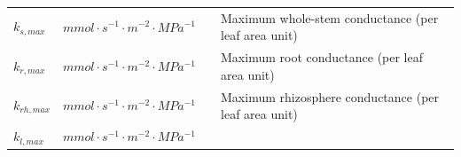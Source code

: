 \documentclass[]{book}
\begin{document}
\begin{longtable}[]{@{}llll@{}}
\begin{minipage}[t]{0.11\columnwidth}\raggedright\strut
\(k_{s, max}\)\strut
\end{minipage} & \begin{minipage}[t]{0.10\columnwidth}\raggedright\strut
\(mmol \cdot s^{-1} \cdot m^{-2} \cdot MPa^{-1}\)\strut
\end{minipage} & \begin{minipage}[t]{0.12\columnwidth}\raggedright\strut
\strut
\end{minipage} & \begin{minipage}[t]{0.45\columnwidth}\raggedright\strut
Maximum whole-stem conductance (per leaf area unit)\strut
\end{minipage}\tabularnewline
\begin{minipage}[t]{0.11\columnwidth}\raggedright\strut
\(k_{r, max}\)\strut
\end{minipage} & \begin{minipage}[t]{0.10\columnwidth}\raggedright\strut
\(mmol \cdot s^{-1} \cdot m^{-2} \cdot MPa^{-1}\)\strut
\end{minipage} & \begin{minipage}[t]{0.12\columnwidth}\raggedright\strut
\strut
\end{minipage} & \begin{minipage}[t]{0.45\columnwidth}\raggedright\strut
Maximum root conductance (per leaf area unit)\strut
\end{minipage}\tabularnewline
\begin{minipage}[t]{0.11\columnwidth}\raggedright\strut
\(k_{rh, max}\)\strut
\end{minipage} & \begin{minipage}[t]{0.10\columnwidth}\raggedright\strut
\(mmol \cdot s^{-1} \cdot m^{-2} \cdot MPa^{-1}\)\strut
\end{minipage} & \begin{minipage}[t]{0.12\columnwidth}\raggedright\strut
\strut
\end{minipage} & \begin{minipage}[t]{0.45\columnwidth}\raggedright\strut
Maximum rhizosphere conductance (per leaf area unit)\strut
\end{minipage}\tabularnewline
\begin{minipage}[t]{0.11\columnwidth}\raggedright\strut
\(k_{l, max}\)\strut
\end{minipage} & \begin{minipage}[t]{0.10\columnwidth}\raggedright\strut
\(mmol \cdot s^{-1} \cdot m^{-2} \cdot MPa^{-1}\)\strut

\end{minipage}
\end{longtable}
\end{document}
